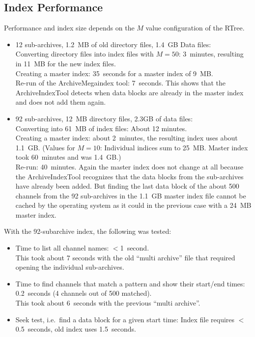 \subsection{Index Performance}
Performance and index size depends on the $M$ value configuration of
the RTree.
\begin{itemize}
\item 12 sub-archives, 1.2~MB of old directory files, 1.4~GB Data
      files:\\
      Converting directory files into index files with $M=50$:
      3~minutes, resulting in 11~MB for the new index files.\\
      Creating a master index: 35~seconds for a master index of 9~MB.\\
      Re-run of the ArchiveMegaindex tool: 7~seconds.
      This shows that the ArchiveIndexTool detects when data blocks
      are already in the master index and does not add them again.
\item 92 sub-archives, 12~MB directory files, 2.3GB of data files:\\
      Converting into 61~MB of index files: About 12 minutes.\\
      Creating a master index: about 2~minutes, the resulting
      index uses about 1.1~GB.
      (Values for $M=10$: Individual indices sum to 25~MB. Master
      index took 60~minutes and was 1.4~GB.)\\
      Re-run: 40~minutes. Again the master index does not change at
      all because the ArchiveIndexTool recognizes that the data blocks
      from the sub-archives have already been added. But finding the
      last data block of the about 500 channels from the 92
      sub-archives in the 1.1~GB master index file cannot be cached by
      the operating system as it could in the previous case with a
      24~MB master index.
\end{itemize}

\noindent With the 92-subarchive index, the following was tested:
\begin{itemize}
\item Time to list all channel names: $<$1~second.\\
      This took about 7 seconds with the old ``multi archive'' file
      that required opening the individual sub-archives.
\item Time to find channels that match a pattern and show their
      start/end times: 0.2~seconds (4 channels out of 500 matched).\\
      This took about 6~seconds with the previous ``multi archive''.
\item Seek test, i.e.\ find a data block for a given start time:
      Index file requires $<$0.5~seconds, old index uses 1.5~seconds.
\end{itemize}

